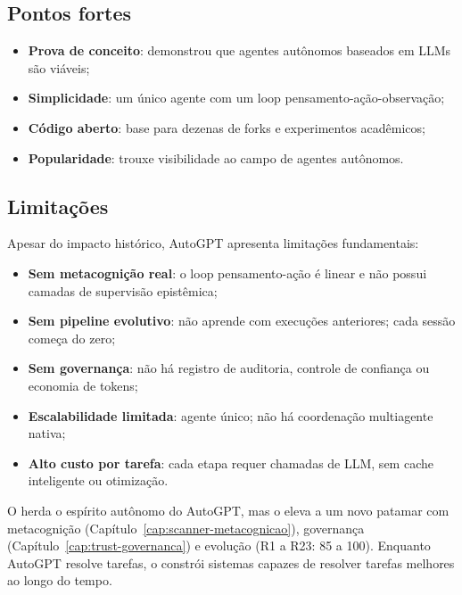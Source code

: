 \subsection{Pontos fortes}

\begin{itemize}
    \item \textbf{Prova de conceito}: demonstrou que agentes autônomos
          baseados em LLMs são viáveis;
    \item \textbf{Simplicidade}: um único agente com um loop
          pensamento-ação-observação;
    \item \textbf{Código aberto}: base para dezenas de forks e
          experimentos acadêmicos;
    \item \textbf{Popularidade}: trouxe visibilidade ao campo de agentes
          autônomos.
\end{itemize}

\subsection{Limitações}

Apesar do impacto histórico, AutoGPT apresenta limitações fundamentais:

\begin{itemize}
    \item \textbf{Sem metacognição real}: o loop pensamento-ação é linear e
          não possui camadas de supervisão epistêmica;
    \item \textbf{Sem pipeline evolutivo}: não aprende com execuções
          anteriores; cada sessão começa do zero;
    \item \textbf{Sem governança}: não há registro de auditoria, controle
          de confiança ou economia de tokens;
    \item \textbf{Escalabilidade limitada}: agente único; não há
          coordenação multiagente nativa;
    \item \textbf{Alto custo por tarefa}: cada etapa requer chamadas de
          LLM, sem cache inteligente ou otimização.
\end{itemize}

\noindent O \opencodeeco{} herda o espírito autônomo do AutoGPT, mas o
eleva a um novo patamar com metacognição (Capítulo~\ref{cap:scanner-metacognicao}),
governança (Capítulo~\ref{cap:trust-governanca}) e evolução (R1 a R23:
85 a 100). Enquanto AutoGPT resolve tarefas, o \opencodeeco{} constrói
sistemas capazes de resolver tarefas melhores ao longo do tempo.

